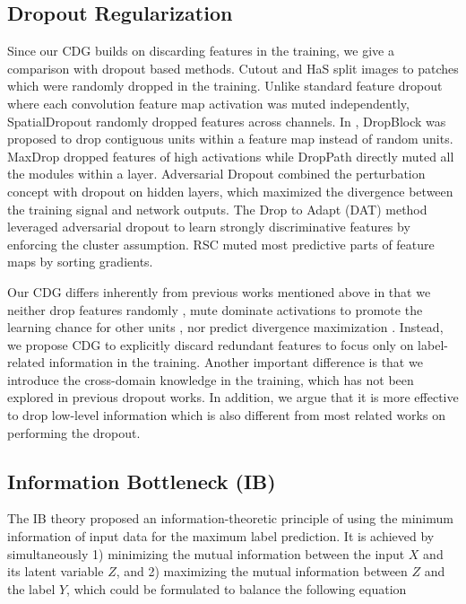\subsection{Dropout Regularization}
Since our CDG builds on discarding features in the training, we give a comparison with dropout based methods. Cutout \citep{devries2017improved} and HaS \citep{singh2017hide} split images to patches which were randomly dropped in the training. Unlike standard feature dropout where each convolution feature map activation was muted independently, SpatialDropout \citep{tompson2015efficient} randomly dropped features across channels. In \citep{ghiasi2018dropblock}, DropBlock was proposed to drop contiguous units within a feature map instead of random units. MaxDrop \citep{park2016analysis} dropped features of high activations while DropPath directly muted all the modules within a layer. Adversarial Dropout \citep{ParkPSM18} combined the perturbation concept with dropout on hidden layers, which maximized the divergence between the training signal and network outputs. The Drop to Adapt (DAT) method leveraged adversarial dropout \citep{ParkPSM18} to learn strongly discriminative features by enforcing the cluster assumption. RSC \citep{huangRSC2020} muted most predictive parts of feature maps by sorting gradients.

Our CDG differs inherently from previous works mentioned above in that we neither drop features randomly \citep{devries2017improved, singh2017hide, ghiasi2018dropblock}, mute dominate activations to promote the learning chance for other units \citep{park2016analysis,huangRSC2020}, nor predict divergence maximization \citep{ParkPSM18}. Instead, we propose CDG to explicitly discard redundant features to focus only on label-related information in the training. Another important difference is that we introduce the cross-domain knowledge in the training, which has not been explored in previous dropout works. In addition, we argue that it is more effective to drop low-level information which is also different from most related works on performing the dropout.

\subsection{Information Bottleneck (IB)} The IB theory proposed an information-theoretic principle of using the minimum information of input data for the maximum label prediction. It is achieved by simultaneously 1) minimizing the mutual information between the input $X$ and its latent variable $Z$, and 2) maximizing the mutual information between $Z$ and the label $Y$, which could be formulated to balance the following equation

